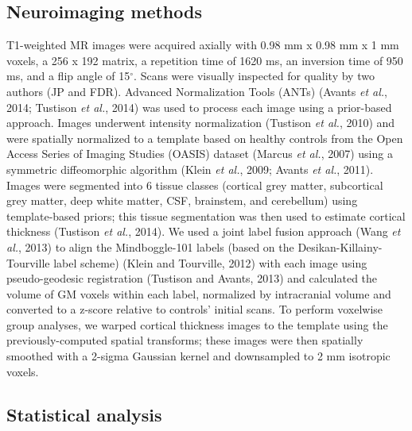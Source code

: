 \documentclass[]{article}
\begin{document}
\subsection*{Neuroimaging methods}\label{neuroimaging-methods}

T1-weighted MR images were acquired axially with 0.98 mm x 0.98 mm x 1
mm voxels, a 256 x 192 matrix, a repetition time of 1620 ms, an
inversion time of 950 ms, and a flip angle of 15\(^\circ\). Scans were
visually inspected for quality by two authors (JP and FDR). Advanced
Normalization Tools (ANTs) (Avants \emph{et al.}, 2014; Tustison
\emph{et al.}, 2014) was used to process each image using a prior-based
approach. Images underwent intensity normalization (Tustison \emph{et
al.}, 2010) and were spatially normalized to a template based on healthy
controls from the Open Access Series of Imaging Studies (OASIS) dataset
(Marcus \emph{et al.}, 2007) using a symmetric diffeomorphic algorithm
(Klein \emph{et al.}, 2009; Avants \emph{et al.}, 2011). Images were
segmented into 6 tissue classes (cortical grey matter, subcortical grey
matter, deep white matter, CSF, brainstem, and cerebellum) using
template-based priors; this tissue segmentation was then used to
estimate cortical thickness (Tustison \emph{et al.}, 2014). We used a
joint label fusion approach (Wang \emph{et al.}, 2013) to align the
Mindboggle-101 labels (based on the Desikan-Killainy-Tourville label
scheme) (Klein and Tourville, 2012) with each image using
pseudo-geodesic registration (Tustison and Avants, 2013) and calculated
the volume of GM voxels within each label, normalized by intracranial
volume and converted to a z-score relative to controls' initial scans.
To perform voxelwise group analyses, we warped cortical thickness images
to the template using the previously-computed spatial transforms; these
images were then spatially smoothed with a 2-sigma Gaussian kernel and
downsampled to 2 mm isotropic voxels.

\subsection*{Statistical analysis}\label{statistical-analysis}
\end{document}
